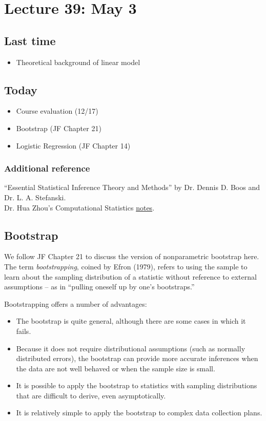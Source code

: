 \setcounter{section}{38}

\section{Lecture 39: May 3}


\subsection*{Last time}
\begin{itemize}
\item Theoretical background of linear model
\end{itemize}


\subsection*{Today}
\begin{itemize}
\item Course evaluation (12/17)
\item Bootstrap (JF Chapter 21)
\item Logistic Regression (JF Chapter 14)
\end{itemize}

\subsubsection*{Additional reference}
``Essential Statistical Inference Theory and Methods'' by Dr. Dennis D. Boos and Dr.  L. A. Stefanski.\\
Dr. Hua Zhou's Computational Statistics \href{http://hua-zhou.github.io/teaching/st758-2014fall/ST758-2014-Fall-LecNotes.pdf}{notes}.

\subsection*{Bootstrap}
We follow JF Chapter 21 to discuss the version of nonparametric bootstrap here.
The term {\it bootstrapping}, coined by Efron (1979), refers to using the sample to learn about the sampling distribution of a statistic without reference to external assumptions -- as in ``pulling oneself up by one's bootstraps.''

Bootstrapping offers a number of advantages:
\begin{itemize}
	\item The bootstrap is quite general, although there are some cases in which it fails.
	\item Because it does not require distributional assumptions (such as normally distributed errors), the bootstrap can provide more accurate inferences when the data are not well behaved or when the sample size is small.
	\item It is possible to apply the bootstrap to statistics with sampling distributions that are difficult to derive, even asymptotically.
	\item It is relatively simple to apply the bootstrap to complex data collection plans.
\end{itemize}


